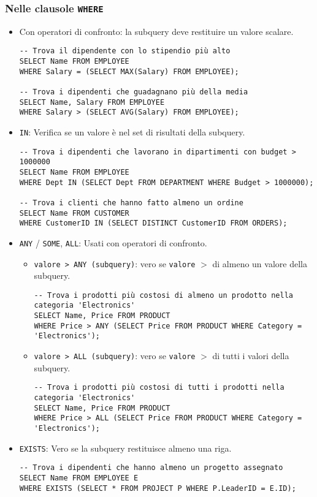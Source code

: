 	\subsubsection{Nelle clausole \texttt{WHERE}}
	\begin{itemize}
		\item Con operatori di confronto: la subquery deve restituire un valore scalare.
		\begin{verbatim}
-- Trova il dipendente con lo stipendio più alto
SELECT Name FROM EMPLOYEE 
WHERE Salary = (SELECT MAX(Salary) FROM EMPLOYEE);

-- Trova i dipendenti che guadagnano più della media
SELECT Name, Salary FROM EMPLOYEE 
WHERE Salary > (SELECT AVG(Salary) FROM EMPLOYEE);
		\end{verbatim}
		\item \texttt{IN}: Verifica se un valore è nel set di risultati della subquery.
		\begin{verbatim}
-- Trova i dipendenti che lavorano in dipartimenti con budget > 1000000
SELECT Name FROM EMPLOYEE 
WHERE Dept IN (SELECT Dept FROM DEPARTMENT WHERE Budget > 1000000);

-- Trova i clienti che hanno fatto almeno un ordine
SELECT Name FROM CUSTOMER 
WHERE CustomerID IN (SELECT DISTINCT CustomerID FROM ORDERS);
		\end{verbatim}
		\item \texttt{ANY} / \texttt{SOME}, \texttt{ALL}: Usati con operatori di confronto.
		\begin{itemize}
			\item \texttt{valore > ANY (subquery)}: vero se \texttt{valore} $>$ di almeno un valore della subquery.
			\begin{verbatim}
-- Trova i prodotti più costosi di almeno un prodotto nella categoria 'Electronics'
SELECT Name, Price FROM PRODUCT 
WHERE Price > ANY (SELECT Price FROM PRODUCT WHERE Category = 'Electronics');
			\end{verbatim}
			\item \texttt{valore > ALL (subquery)}: vero se \texttt{valore} $>$ di tutti i valori della subquery.
			\begin{verbatim}
-- Trova i prodotti più costosi di tutti i prodotti nella categoria 'Electronics'
SELECT Name, Price FROM PRODUCT 
WHERE Price > ALL (SELECT Price FROM PRODUCT WHERE Category = 'Electronics');
			\end{verbatim}
		\end{itemize}
		\item \texttt{EXISTS}: Vero se la subquery restituisce almeno una riga.
		\begin{verbatim}
-- Trova i dipendenti che hanno almeno un progetto assegnato
SELECT Name FROM EMPLOYEE E
WHERE EXISTS (SELECT * FROM PROJECT P WHERE P.LeaderID = E.ID);


\end{verbatim}
\end{itemize}
